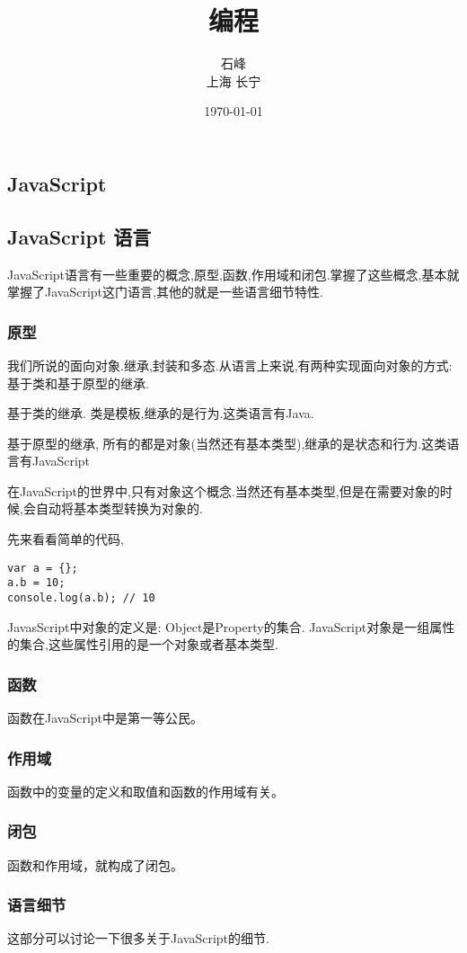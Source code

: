 \documentclass[12pt, oneside, b5paper]{book}
\title{编程}
\author{石峰\\
			上海 长宁}
\date{\today}
\begin{document}
  
\begin{CJK}{UTF8}{gkai}
\maketitle

\chapter{JavaScript}
	\section{JavaScript 语言}
	JavaScript语言有一些重要的概念,原型,函数,作用域和闭包.掌握了这些概念,基本就掌握了JavaScript这门语言,其他的就是一些语言细节特性.
		\subsection{原型}
		我们所说的面向对象.继承,封装和多态.从语言上来说,有两种实现面向对象的方式:基于类和基于原型的继承.
	
		基于类的继承. 类是模板,继承的是行为.这类语言有Java.
		
		基于原型的继承, 所有的都是对象(当然还有基本类型),继承的是状态和行为.这类语言有JavaScript

		在JavaScript的世界中,只有对象这个概念.当然还有基本类型,但是在需要对象的时候,会自动将基本类型转换为对象的.

		先来看看简单的代码,
	
		\begin{lstlisting}
var a = {};	
a.b = 10;
console.log(a.b); // 10
		\end{lstlisting}

		JavasScript中对象的定义是: Object是Property的集合. JavaScript对象是一组属性的集合,这些属性引用的是一个对象或者基本类型.
	
		\subsection{函数}
		函数在JavaScript中是第一等公民。
		\subsection{作用域}
		函数中的变量的定义和取值和函数的作用域有关。
		\subsection{闭包}
		函数和作用域，就构成了闭包。
		\subsection{语言细节}
		这部分可以讨论一下很多关于JavaScript的细节.

\end{CJK}
\end{document}
